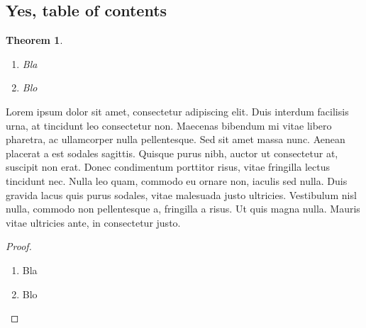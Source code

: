 \documentclass[twoside]{ctuthesis}
\theoremstyle{plain}
\newtheorem{theorem}{Theorem}[chapter]
\theoremstyle{definition}
\theoremstyle{note}
\begin{document}
\subsection{Yes, table of contents}

\begin{theorem}\begin{enumerate} \item Bla \item Blo \end{enumerate} \end{theorem}


Lorem ipsum dolor sit amet, consectetur adipiscing elit. Duis interdum facilisis urna, at tincidunt leo consectetur non. Maecenas bibendum mi vitae libero pharetra, ac ullamcorper nulla pellentesque. Sed sit amet massa nunc. Aenean placerat a est sodales sagittis. Quisque purus nibh, auctor ut consectetur at, suscipit non erat. Donec condimentum porttitor risus, vitae fringilla lectus tincidunt nec. Nulla leo quam, commodo eu ornare non, iaculis sed nulla. Duis gravida lacus quis purus sodales, vitae malesuada justo ultricies. Vestibulum nisl nulla, commodo non pellentesque a, fringilla a risus. Ut quis magna nulla. Mauris vitae ultricies ante, in consectetur justo. 

\medskip

\begin{proof}\begin{enumerate} \item[8] Bla \item Blo \end{enumerate} \end{proof}

\appendix

\printindex



\end{document}
